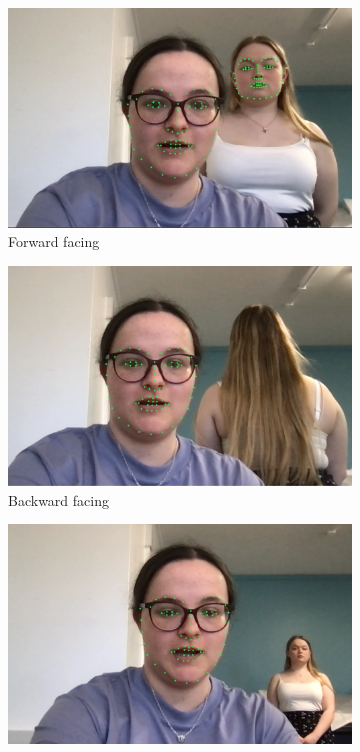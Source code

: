 \documentclass[12pt]{article}
\theoremstyle{plain}
\theoremstyle{definition}
\begin{document}
\begin{figure}[h!]
     \centering
     \begin{subfigure}[b]{0.3\textwidth}
         \centering
         \includegraphics[width=\textwidth]{img/face_img1.png}
         \caption{Forward facing}
         \label{fig:face_a}
     \end{subfigure}
     \hfill
     \begin{subfigure}[b]{0.3\textwidth}
         \centering
         \includegraphics[width=\textwidth]{img/face_img2.png}
         \caption{Backward facing}
         \label{fig:face_b}
     \end{subfigure}
     \hfill
     \begin{subfigure}[b]{0.3\textwidth}
         \centering
         \includegraphics[width=\textwidth]{img/face_img3.png}

\end{subfigure}
\end{figure}
\end{document}
